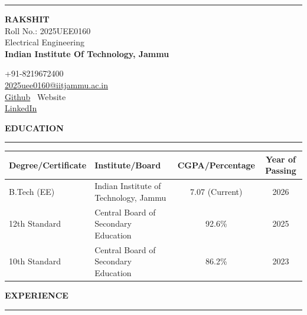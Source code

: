 \documentclass[a4paper,10pt]{article}
\begin{document}
\begin{minipage}[c]{0.12\textwidth}
    \rule{1.2cm}{1.2cm} 
\end{minipage}
\begin{minipage}[c]{0.50\textwidth}
    {\Large \textbf{RAKSHIT}} \\
    Roll No.: 2025UEE0160 \\
    Electrical Engineering \\
    \textbf{Indian Institute Of Technology, Jammu}
\end{minipage}
\begin{minipage}[c]{0.36\textwidth}
    \raggedleft
    +91-8219672400 \\
    \href{mailto:2025uee0160@iitjammu.ac.in}{2025uee0160@iitjammu.ac.in} \\
    \href{https://github.com/rakshitsh45}{Github} \textbar\ Website \\
    \href{https://linkedin.com/in/}{LinkedIn}
\end{minipage}

\vspace{8pt}

{\large \textbf{EDUCATION}}
\vspace{-4pt}
\hrule
\vspace{4pt}

\begin{tabularx}{\textwidth}{|X|X|c|c|}
\hline
\textbf{Degree/Certificate} & \textbf{Institute/Board} & \textbf{CGPA/Percentage} & \textbf{Year of Passing} \\
\hline
B.Tech (EE) & Indian Institute of Technology, Jammu & 7.07 (Current) & 2026 \\
\hline
12th Standard & Central Board of Secondary Education & 92.6\% & 2025 \\
\hline
10th Standard & Central Board of Secondary Education & 86.2\% & 2023 \\
\hline
\end{tabularx}

\vspace{8pt}

{\large \textbf{EXPERIENCE}}
\vspace{-4pt}
\hrule
\vspace{4pt}
\end{document}
